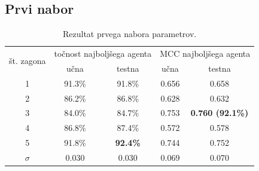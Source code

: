 \subsection{Prvi nabor}\label{subsec:dodatek-statlog-prvi-nabor}
\begin{table}[H]
    \begin{center}
        \begin{tabular}{|| c | c c || c c ||}
            \hline
            \multirow{2}{*}{št. zagona} & \multicolumn{2}{c||}{točnost najboljšega agenta} & \multicolumn{2}{c||}{MCC najboljšega agenta} \\ \cline{2-5}
            & učna   & testna          & učna  & testna                  \\
            \hline
            1        & 91.3\% & 91.8\%          & 0.656 & 0.658                   \\
            \hline
            2        & 86.2\% & 86.8\%          & 0.628 & 0.632                   \\
            \hline
            3        & 84.0\% & 84.7\%          & 0.753 & \textbf{0.760 (92.1\%)} \\
            \hline
            4        & 86.8\% & 87.4\%          & 0.572 & 0.578                   \\
            \hline
            5        & 91.8\% & \textbf{92.4\%} & 0.744 & 0.752                   \\
            \hline
            $\sigma$ & 0.030  & 0.030           & 0.069 & 0.070                   \\
            \hline
        \end{tabular}
    \end{center}
    \caption{Rezultat prvega nabora parametrov.}
    \label{tab:statlog_result_1}
\end{table}

